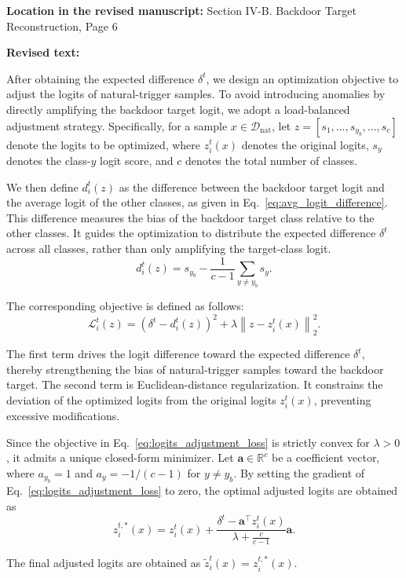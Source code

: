 \documentclass[11pt,a4paper]{article}
\newcommand{\manualindent}{\par\noindent\hspace*{1.5em}\ignorespaces}
\newcommand{\revisedtext}[2]{%
  {\bfseries\color{headingnavy}Location in the revised manuscript:} #1\par
  \begin{tcolorbox}[
      enhanced,breakable,colback=replyblue!3,colframe=replyblue!18,
      before upper={\setlength{\parskip}{6pt}},
      borderline west={2.5pt}{0pt}{replyblue},
      boxrule=0.5pt,arc=1mm,left=11pt,right=9pt,top=8pt,bottom=8pt]
    {\bfseries\color{headingnavy}Revised text:}\par
    #2
  \end{tcolorbox}
  \vspace{0.35em}%
}
\begin{document}
\revisedtext{Section IV-B. Backdoor Target Reconstruction, Page 6}{\manualindent After obtaining the expected difference $\delta^t$, we design an optimization objective to adjust the logits of natural-trigger samples.
To avoid introducing anomalies by directly amplifying the backdoor target logit, we adopt a load-balanced adjustment strategy.
Specifically, for a sample $x\in\mathcal{D}_{\mathrm{nat}}$, let $z=[s_1,\dots,s_{y_b},\dots,s_c]$ denote the logits to be optimized, where $z_i^t(x)$ denotes the original logits, $s_y$ denotes the class-$y$ logit score, and $c$ denotes the total number of classes.

\manualindent We then define $d_i^t(z)$ as the difference between the backdoor target logit and the average logit of the other classes, as given in Eq.~\ref{eq:avg_logit_difference}.
This difference measures the bias of the backdoor target class relative to the other classes.
It guides the optimization to distribute the expected difference \(\delta^t\) across all classes, rather than only amplifying the target-class logit.
\setcounter{equation}{15}
\begin{equation}
d_i^t(z)
=
s_{y_b}
-
\frac{1}{c-1}
\sum_{y\neq y_b}s_y.
\label{eq:avg_logit_difference}
\end{equation}

The corresponding objective is defined as follows:
\begin{equation}
\mathcal{L}_i^t(z)
=
\left(\delta^t-d_i^t(z)\right)^2
+
\lambda\left\|z-z_i^t(x)\right\|_2^2.
\label{eq:logits_adjustment_loss}
\end{equation}

The first term drives the logit difference toward the expected difference \(\delta^t\), thereby strengthening the bias of natural-trigger samples toward the backdoor target.
The second term is Euclidean-distance regularization.
It constrains the deviation of the optimized logits from the original logits $z_i^t(x)$, preventing excessive modifications.

Since the objective in Eq.~\ref{eq:logits_adjustment_loss} is strictly convex for $\lambda>0$, it admits a unique closed-form minimizer.
Let $\mathbf{a}\in\mathbb{R}^c$ be a coefficient vector, where $a_{y_b}=1$ and $a_y=-1/(c-1)$ for $y\neq y_b$. 
By setting the gradient of Eq.~\ref{eq:logits_adjustment_loss} to zero, the optimal adjusted logits are obtained as
\begin{equation}
z_i^{t,*}(x)
=
z_i^t(x)
+
\frac{
\delta^t-\mathbf{a}^{\top}z_i^t(x)
}{
\lambda+\frac{c}{c-1}
}\mathbf{a}.
\label{eq:closed_form_logits}
\end{equation}

The final adjusted logits are obtained as $\widetilde{z}_i^t(x)=z_i^{t,*}(x)$.
}
\end{document}
